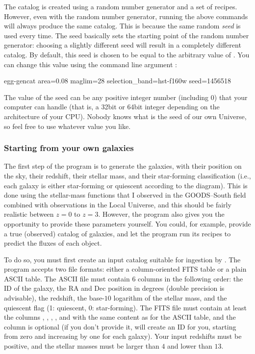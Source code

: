 The catalog is created using a random number generator and a set of recipes. However, even with the random number generator, running the above commands will always produce the same catalog. This is because the same random \emph{seed} is used every time. The seed basically sets the starting point of the random number generator: choosing a slightly different seed will result in a completely different catalog. By default, this seed is chosen to be equal to the arbitrary value of . You can change this value using the command line argument :
\begin{bashcode}
egg-gencat area=0.08 maglim=28 selection_band=hst-f160w seed=1456518
\end{bashcode}
The value of the seed can be any positive integer number (including 0) that your computer can handle (that is, a 32bit or 64bit integer depending on the architecture of your CPU). Nobody knows what is the seed of our own Universe, so feel free to use whatever value you like.

\subsubsection{Starting from your own galaxies}
The first step of the program is to generate the galaxies, with their position on the sky, their redshift, their stellar mass, and their star-forming classification (i.e., each galaxy is either star-forming or quiescent according to the \uvj diagram). This is done using the stellar-mass functions that I observed in the GOODS--South field combined with observations in the Local Universe, and this should be fairly realistic between $z=0$ to $z=3$. However, the program also gives you the opportunity to provide these parameters yourself. You could, for example, provide a true (observed) catalog of galaxies, and let the program run its recipes to predict the fluxes of each object.

To do so, you must first create an input catalog suitable for ingestion by . The program accepts two file formats: either a column-oriented FITS table or a plain ASCII table. The ASCII file must contain $6$ columns in the following order: the ID of the galaxy, the RA and Dec position in degrees (double precision is advisable), the redshift, the base-$10$ logarithm of the stellar mass, and the quiescent flag (1: quiescent, 0: star-forming). The FITS file must contain at least the columns , , , , and  with the same content as for the ASCII table, and the column  is optional (if you don't provide it,  will create an ID for you, starting from zero and increasing by one for each galaxy). Your input redshifts must be positive, and the stellar masses must be larger than $4$ and lower than $13$.

